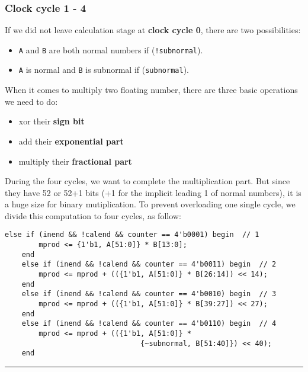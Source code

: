 \documentclass{article}
\begin{document}
            \subsubsection*{Clock cycle 1 - 4}
                If we did not leave calculation stage at {\bf clock cycle 0}, there are two possibilities:
                \begin{itemize}
                    \item {\tt A} and {\tt B} are both normal numbers if ({\tt !subnormal}).
                    \item {\tt A} is normal and {\tt B} is subnormal if ({\tt subnormal}).
                \end{itemize}
                When it comes to multiply two floating number, there are three basic operations we need to do:
                \begin{itemize}
                    \item xor their {\bf sign bit}
                    \item add their {\bf exponential part}
                    \item multiply their {\bf fractional part}
                \end{itemize}

                During the four cycles, we want to complete the multiplication part.
                But since they have 52 or 52+1 bits (+1 for the implicit leading 1 of normal numbers),
                it is a huge size for binary mutiplication.
                To prevent overloading one single cycle, we divide this computation to four cycles, as follow:
                \begin{lstlisting}[style = verilog-style]
    else if (inend && !calend && counter == 4'b0001) begin  // 1
        mprod <= {1'b1, A[51:0]} * B[13:0];
    end
    else if (inend && !calend && counter == 4'b0011) begin  // 2
        mprod <= mprod + (({1'b1, A[51:0]} * B[26:14]) << 14);
    end
    else if (inend && !calend && counter == 4'b0010) begin  // 3
        mprod <= mprod + (({1'b1, A[51:0]} * B[39:27]) << 27);
    end
    else if (inend && !calend && counter == 4'b0110) begin  // 4
        mprod <= mprod + (({1'b1, A[51:0]} * 
                                {~subnormal, B[51:40]}) << 40);
    end
                \end{lstlisting}
                \noindent\rule{\textwidth}{0.1pt} \\
\end{document}
